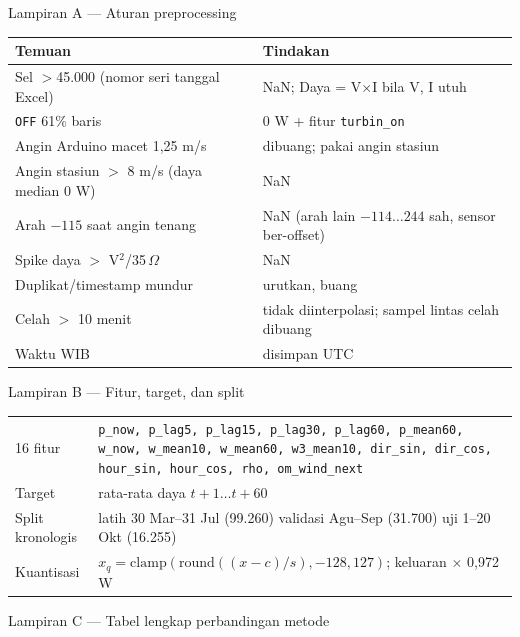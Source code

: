 \documentclass[aspectratio=169, 10pt]{beamer}
\newcommand{\diagram}[1]{}
\begin{document}
\appendix
\begin{frame}{Lampiran A --- Aturan preprocessing}
\small
\begin{tabularx}{\linewidth}{@{}X X@{}}
\toprule
Temuan & Tindakan \\
\midrule
Sel $>$45.000 (nomor seri tanggal Excel) & NaN; Daya = V$\times$I bila V, I utuh \\
\texttt{OFF} 61\% baris & 0 W + fitur \texttt{turbin\_on} \\
Angin Arduino macet 1,25 m/s & dibuang; pakai angin stasiun \\
Angin stasiun $>$ 8 m/s (daya median 0 W) & NaN \\
Arah $-115$ saat angin tenang & NaN (arah lain $-114\ldots244$ sah, sensor ber-offset) \\
Spike daya $>$ V$^2$/35\,$\Omega$ & NaN \\
Duplikat/timestamp mundur & urutkan, buang \\
Celah $>$ 10 menit & tidak diinterpolasi; sampel lintas celah dibuang \\
Waktu WIB & disimpan UTC \\
\bottomrule
\end{tabularx}
\end{frame}

\begin{frame}{Lampiran B --- Fitur, target, dan split}
\centering\resizebox{0.85\linewidth}{!}{\diagram{jendela}}\\[6pt]
\small
\begin{tabularx}{\linewidth}{@{}l X@{}}
\toprule
16 fitur & \texttt{p\_now, p\_lag5, p\_lag15, p\_lag30, p\_lag60, p\_mean60, w\_now, w\_mean10, w\_mean60, w3\_mean10, dir\_sin, dir\_cos, hour\_sin, hour\_cos, rho, om\_wind\_next} \\
Target & rata-rata daya $t{+}1\ldots t{+}60$ \\
Split kronologis & latih 30 Mar--31 Jul (99.260) \textbullet{} validasi Agu--Sep (31.700) \textbullet{} uji 1--20 Okt (16.255) \\
Kuantisasi & $x_q = \mathrm{clamp}(\mathrm{round}((x-c)/s), -128, 127)$; keluaran $\times$ 0,972 W \\
\bottomrule
\end{tabularx}
\end{frame}

\begin{frame}{Lampiran C --- Tabel lengkap perbandingan metode}
\end{frame}
\end{document}
